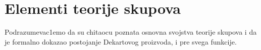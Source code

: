 \documentclass[../main.tex]{subfiles}
\begin{document}
\section{Elementi teorije skupova}

    Podrazumevac1emo da su chitaocu poznata osnovna svojstva teorije skupova i da je formalno dokazao postojanje Dekartovog proizvoda, i pre svega funkcije.
\end{document}
